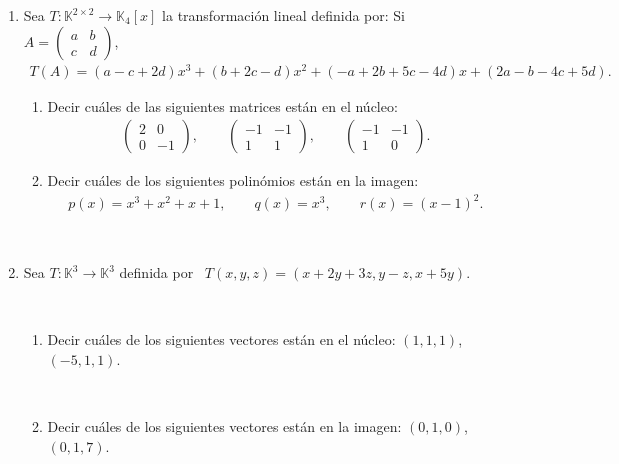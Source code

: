 \documentclass[12pt]{amsart}
\begin{document}
\begin{enumerate}[resume, topsep=5pt,itemsep=5pt]
\item Sea $T:\mathbb{K}^{2\times 2}\longrightarrow\mathbb{K}_{4}[x]$ la transformaci\'on lineal definida por: Si \ $A = \left(\begin{array}{cc}
 a&b\\c&d \end{array}\right)$,
\begin{align*}
T(A)=
(a-c+2d)x^3+(b+2c-d)x^2+
(-a+2b+5c-4d)x+(2a-b-4c+5d).
\end{align*}
\begin{enumerate}
 \item Decir cu\'ales de las siguientes matrices est\'an en el n\'ucleo:
 \begin{align*}
 \left(\begin{array}{rr}
    2&0\\0&-1
   \end{array}
   \right),
   \qquad
   \left(\begin{array}{rr}
    -1&-1\\1&1
   \end{array}
   \right),
   \qquad
   \left(\begin{array}{rr}
    -1&-1\\1&0
   \end{array}
   \right).
 \end{align*}

 \item Decir cu\'ales de los siguientes polin\'omios est\'an en la imagen:
 \begin{align*}
 p(x)=x^3+x^2+x+1,\qquad q(x)=x^3, \qquad r(x)=(x-1)^2.
 \end{align*}

\end{enumerate}

\

\item\label{Txyz} Sea $T:\mathbb{K}^3\longrightarrow\mathbb{K}^3$ definida por \ $T(x,y,z)=(x+2y+3z, y-z,x+5y)$.

\

\begin{enumerate}
\item Decir cu\'ales de los siguientes vectores est\'an en el n\'ucleo: $(1,1,1)$, $(-5,1,1)$.

\

\item Decir cu\'ales de los siguientes vectores est\'an en la imagen: $(0,1,0)$, $(0,1,7)$.

\


\end{enumerate}
\end{enumerate}
\end{document}
